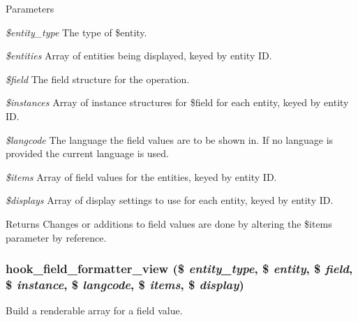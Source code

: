 \begin{DoxyParams}{Parameters}
\item[{\em \$entity\_\-type}]The type of \$entity. \item[{\em \$entities}]Array of entities being displayed, keyed by entity ID. \item[{\em \$field}]The field structure for the operation. \item[{\em \$instances}]Array of instance structures for \$field for each entity, keyed by entity ID. \item[{\em \$langcode}]The language the field values are to be shown in. If no language is provided the current language is used. \item[{\em \$items}]Array of field values for the entities, keyed by entity ID. \item[{\em \$displays}]Array of display settings to use for each entity, keyed by entity ID.\end{DoxyParams}
\begin{DoxyReturn}{Returns}
Changes or additions to field values are done by altering the \$items parameter by reference. 
\end{DoxyReturn}
\hypertarget{group__field__formatter_gaa588d99481fa147a1c88416e55fdfad6}{
\subsubsection[{hook\_\-field\_\-formatter\_\-view}]{\setlength{\rightskip}{0pt plus 5cm}hook\_\-field\_\-formatter\_\-view (\$ {\em entity\_\-type}, \/  \$ {\em entity}, \/  \$ {\em field}, \/  \$ {\em instance}, \/  \$ {\em langcode}, \/  \$ {\em items}, \/  \$ {\em display})}}
\label{group__field__formatter_gaa588d99481fa147a1c88416e55fdfad6}
Build a renderable array for a field value.


